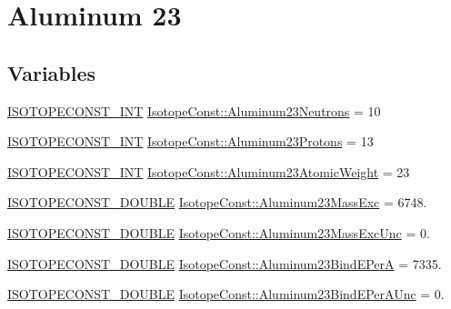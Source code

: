 \hypertarget{group___isotope_const-_aluminum-_al23}{}\section{Aluminum 23}
\label{group___isotope_const-_aluminum-_al23}
\subsection*{Variables}
\begin{DoxyCompactItemize}
\item 
\mbox{\hyperlink{group___isotope_const-_macros_ga5f18360b3e99483a35c32d789e62621c}{I\+S\+O\+T\+O\+P\+E\+C\+O\+N\+S\+T\+\_\+\+I\+NT}} \mbox{\hyperlink{group___isotope_const-_aluminum-_al23_ga77349957d5392628ff730a9a16f22cbe}{Isotope\+Const\+::\+Aluminum23\+Neutrons}} = 10
\item 
\mbox{\hyperlink{group___isotope_const-_macros_ga5f18360b3e99483a35c32d789e62621c}{I\+S\+O\+T\+O\+P\+E\+C\+O\+N\+S\+T\+\_\+\+I\+NT}} \mbox{\hyperlink{group___isotope_const-_aluminum-_al23_ga45df744f167464a340216bcf6d2b5d54}{Isotope\+Const\+::\+Aluminum23\+Protons}} = 13
\item 
\mbox{\hyperlink{group___isotope_const-_macros_ga5f18360b3e99483a35c32d789e62621c}{I\+S\+O\+T\+O\+P\+E\+C\+O\+N\+S\+T\+\_\+\+I\+NT}} \mbox{\hyperlink{group___isotope_const-_aluminum-_al23_ga76bbe563623847700d7d27ba036a6382}{Isotope\+Const\+::\+Aluminum23\+Atomic\+Weight}} = 23
\item 
\mbox{\hyperlink{group___isotope_const-_macros_ga8f45a7272ce02c0b4c65c44636ed719a}{I\+S\+O\+T\+O\+P\+E\+C\+O\+N\+S\+T\+\_\+\+D\+O\+U\+B\+LE}} \mbox{\hyperlink{group___isotope_const-_aluminum-_al23_gab5c9eaf2b8ccd73c0f4ce413c2b1a9b7}{Isotope\+Const\+::\+Aluminum23\+Mass\+Exc}} = 6748.
\item 
\mbox{\hyperlink{group___isotope_const-_macros_ga8f45a7272ce02c0b4c65c44636ed719a}{I\+S\+O\+T\+O\+P\+E\+C\+O\+N\+S\+T\+\_\+\+D\+O\+U\+B\+LE}} \mbox{\hyperlink{group___isotope_const-_aluminum-_al23_ga80be217f1b372cbe79b42d5241cc7448}{Isotope\+Const\+::\+Aluminum23\+Mass\+Exc\+Unc}} = 0.
\item 
\mbox{\hyperlink{group___isotope_const-_macros_ga8f45a7272ce02c0b4c65c44636ed719a}{I\+S\+O\+T\+O\+P\+E\+C\+O\+N\+S\+T\+\_\+\+D\+O\+U\+B\+LE}} \mbox{\hyperlink{group___isotope_const-_aluminum-_al23_ga10e8fc6a207ac91f41cd704b2e383d3e}{Isotope\+Const\+::\+Aluminum23\+Bind\+E\+PerA}} = 7335.
\item 
\mbox{\hyperlink{group___isotope_const-_macros_ga8f45a7272ce02c0b4c65c44636ed719a}{I\+S\+O\+T\+O\+P\+E\+C\+O\+N\+S\+T\+\_\+\+D\+O\+U\+B\+LE}} \mbox{\hyperlink{group___isotope_const-_aluminum-_al23_gae96bcf5436821b5751decc85ef01f79b}{Isotope\+Const\+::\+Aluminum23\+Bind\+E\+Per\+A\+Unc}} = 0.

\end{DoxyCompactItemize}
